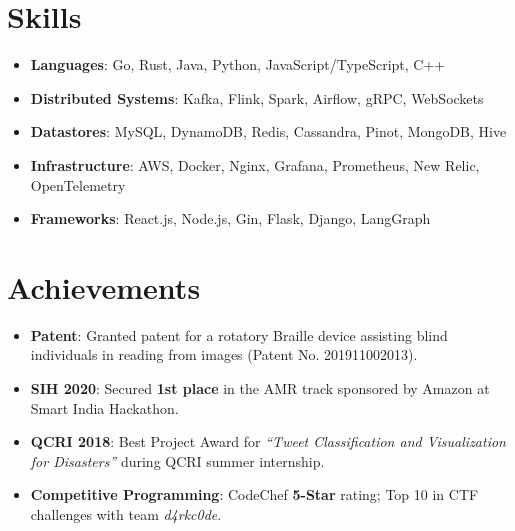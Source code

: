 \documentclass[letterpaper,10pt]{article}
\newcommand{\resumeItem}[2]{
  \item\small{
    \textbf{#1}{: #2 \vspace{-2pt}}
  }
}
\newcommand{\resumeSubHeadingListStart}{\begin{itemize}[leftmargin=*]}
\newcommand{\resumeSubHeadingListEnd}{\end{itemize}}
\newcommand{\shorterSection}[1]{\vspace{-4pt}\section{#1}}
\begin{document}
\shorterSection{Skills}
  \resumeSubHeadingListStart
  \small
    \item{
     \textbf{Languages}{: Go, Rust, Java, Python, JavaScript/TypeScript, C++}
    }
    \vspace{-4pt}
    \item{
     \textbf{Distributed Systems}{: Kafka, Flink, Spark, Airflow, gRPC, WebSockets}
    }
    \vspace{-4pt}
    \item{
     \textbf{Datastores}{: MySQL, DynamoDB, Redis, Cassandra, Pinot, MongoDB, Hive}
    }
    \vspace{-4pt}
    \item{
     \textbf{Infrastructure}{: AWS, Docker, Nginx, Grafana, Prometheus, New Relic, OpenTelemetry}
    }
    \vspace{-4pt}
    \item{
     \textbf{Frameworks}{: React.js, Node.js, Gin, Flask, Django, LangGraph}
    }
     \vspace{-5pt}
\resumeSubHeadingListEnd

\shorterSection{Achievements}
  \resumeSubHeadingListStart
  \small
    \resumeItem{Patent}
      {Granted patent for a rotatory Braille device assisting blind individuals in reading from images (Patent No. 201911002013).}
    \resumeItem{SIH 2020}
      {Secured \textbf{1st place} in the AMR track sponsored by Amazon at Smart India Hackathon.}
    \resumeItem{QCRI 2018}
      {Best Project Award for \textit{``Tweet Classification and Visualization for Disasters''} during QCRI summer internship.}
    \resumeItem{Competitive Programming}
      {CodeChef \textbf{5-Star} rating; Top 10 in CTF challenges with team \textit{d4rkc0de}.}
  \resumeSubHeadingListEnd

\end{document}
